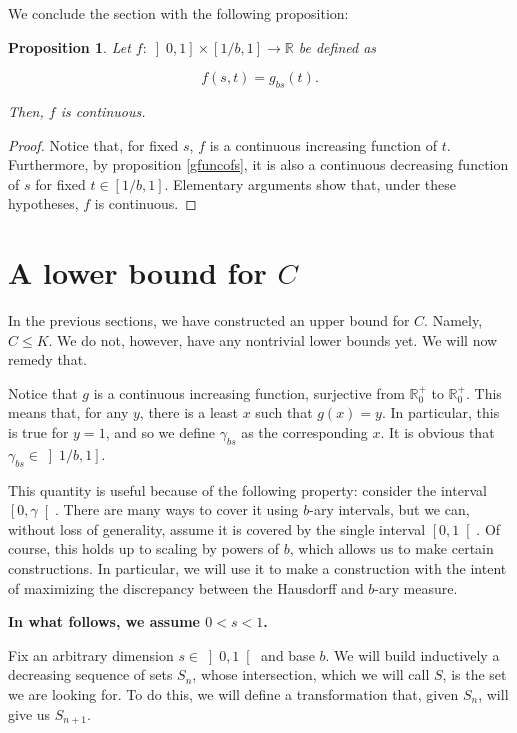 \documentclass[11pt, reqno]{amsart}
\newcommand{\R}{\mathbb{R}}
\newtheorem{prop}{Proposition}
\begin{document}
We conclude the section with the following proposition:

\begin{prop}
Let $f : \left]0, 1\right] \times \left[1/b, 1\right] \to \R$ be defined as

\[f(s, t) = g_{bs}(t).\]

Then, $f$ is continuous.
\end{prop}

\begin{proof}
Notice that, for fixed $s$, $f$ is a continuous increasing function of $t$. Furthermore, by proposition \ref{gfuncofs}, it is also a continuous decreasing function of $s$ for fixed $t \in \left[1/b, 1 \right]$. Elementary arguments show that, under these hypotheses, $f$ is continuous. %
\end{proof}

\section{A lower bound for $C$}\label{seclowerbound}

In the previous sections, we have constructed an upper bound for $C$. Namely, $C \leq K$. We do not, however, have any nontrivial lower bounds yet. We will now remedy that.

Notice that $g$ is a continuous increasing function, surjective from $\R^+_0$ to $\R^+_0$. This means that, for any $y$, there is a least $x$ such that $g(x) = y$. In particular, this is true for $y = 1$, and so we define $\gamma_{bs}$ as the corresponding $x$. It is obvious that $\gamma_{bs} \in \left] 1/b, 1 \right]$.

This quantity is useful because of the following property: consider the interval $\left[0, \gamma \right[$. There are many ways to cover it using $b$-ary intervals, but we can, without loss of generality, assume it is covered by the single interval $\left[0, 1 \right[$. Of course, this holds up to scaling by powers of $b$, which allows us to make certain constructions. In particular, we will use it to make a construction with the intent of maximizing the discrepancy between the Hausdorff and $b$-ary measure.

\textbf{In what follows, we assume $0 < s < 1$.}

Fix an arbitrary dimension $s \in \left]0, 1 \right[$ and base $b$. We will build inductively a decreasing sequence of sets $S_n$, whose intersection, which we will call $S$, is the set we are looking for. To do this, we will define a transformation that, given $S_n$, will give us $S_{n+1}$.
\end{document}
